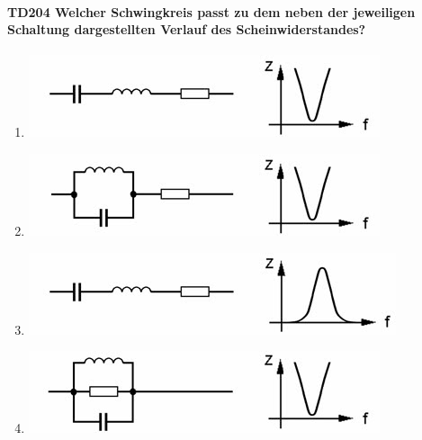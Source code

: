 \documentclass[8pt]{article}
\begin{document}
\begin{enumerate}
\begin{enumerate}[nolistsep,label=\Alph*]
{\paragraph*{TD204 Welcher Schwingkreis passt zu dem neben der jeweiligen Schaltung dargestellten Verlauf des Scheinwiderstandes?}
\begin{enumerate}[nolistsep,label=\Alph*]
\item
\begin{center}
	\begin{minipage}{\linewidth}
		\centering
		\includegraphics[scale=1.0]{pics/td204_a.jpg}
	\end{minipage}
\end{center}
\item
\begin{center}
	\begin{minipage}{\linewidth}
		\centering
		\includegraphics[scale=1.0]{pics/td204_b.jpg}
	\end{minipage}
\end{center}
\item
\begin{center}
	\begin{minipage}{\linewidth}
		\centering
		\includegraphics[scale=1.0]{pics/td204_c.jpg}
	\end{minipage}
\end{center}
\item
\begin{center}
	\begin{minipage}{\linewidth}
		\centering
		\includegraphics[scale=1.0]{pics/td204_d.jpg}
	\end{minipage}
\end{center}
\end{enumerate}

}
\end{enumerate}
\end{enumerate}
\end{document}

